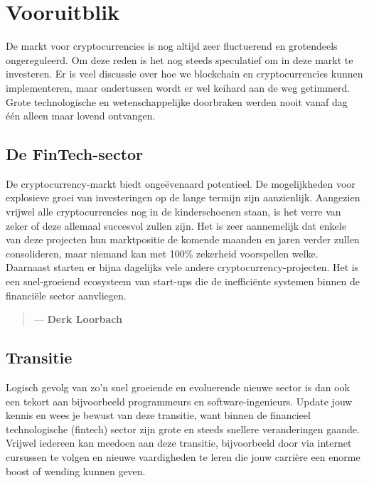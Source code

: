 \chapter{Vooruitblik}
\label{ch:vooruitblik}

De markt voor cryptocurrencies is nog altijd zeer fluctuerend en grotendeels ongereguleerd. Om deze reden is het nog steeds speculatief om in deze markt te investeren. Er is veel discussie over hoe we blockchain en cryptocurrencies kunnen implementeren, maar ondertussen wordt er wel keihard aan de weg getimmerd. Grote technologische en wetenschappelijke doorbraken werden nooit vanaf dag {\'e}{\'e}n alleen maar lovend ontvangen.\bigskip



\section*{De FinTech-sector}
De cryptocurrency-markt biedt onge{\"e}venaard potentieel. De mogelijkheden voor explosieve groei van investeringen op de lange termijn zijn aanzienlijk. Aangezien vrijwel alle cryptocurrencies nog in de kinderschoenen staan, is het verre van zeker of deze allemaal succesvol zullen zijn. Het is zeer aannemelijk dat enkele van deze projecten hun marktpositie de komende maanden en jaren verder zullen consolideren, maar niemand kan met 100\% zekerheid voorspellen welke. Daarnaast starten er bijna dagelijks vele andere cryptocurrency-projecten. Het is een snel-groeiend ecosysteem van start-ups die de ineffici{\"e}nte systemen binnen de financi{\"e}le sector aanvliegen.

  \bigskip
    \begin{quotation}
          \textit{}
          \begin{flushright}
            \small{--- \textbf{Derk Loorbach}}
          \end{flushright}
    \end{quotation}


\section*{Transitie}
Logisch gevolg van zo'n snel groeiende en evoluerende nieuwe sector is dan ook een tekort aan bijvoorbeeld programmeurs en software-ingenieurs. Update jouw kennis en wees je bewust van deze transitie, want binnen de financieel technologische (fintech) sector zijn grote en steeds snellere veranderingen gaande. Vrijwel iedereen kan meedoen aan deze transitie, bijvoorbeeld door via internet cursussen te volgen en nieuwe vaardigheden te leren die jouw carri{\`e}re een enorme boost of wending kunnen geven.  

